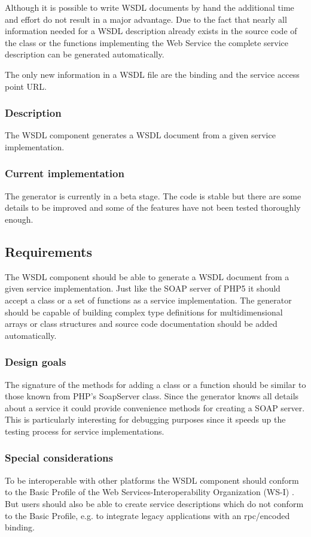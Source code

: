 \documentclass[10pt,final,a4paper,oneside]{article}
\begin{document}
Although it is possible
to write WSDL documents by hand
the additional time and effort
do not result in a major advantage.
Due to the fact that nearly all information
needed for a WSDL description already exists
in the source code of the class or the functions
implementing the Web Service
the complete service description
can be generated automatically.

The only new information in a WSDL file
are the binding and the service access point URL.

\subsubsection{Description}
The WSDL component generates a WSDL document
from a given service implementation.

\subsubsection{Current implementation}
The generator is currently in a beta stage.
The code is stable but there are some details to be improved
and some of the features have not been tested thoroughly enough.

\subsection{Requirements}\label{subsec:WSDLRequirements}
The WSDL component should be able to generate a WSDL document
from a given service implementation.
Just like the SOAP server of PHP5 it should accept
a class or a set of functions as a service implementation.
The generator should be capable of building complex type definitions
for multidimensional arrays or class structures and source code documentation should be added
automatically.

\subsubsection{Design goals}

The signature of the methods for adding a class or a function should
be similar to those known from PHP's SoapServer class.
Since the generator knows all details about a service
it could provide convenience methods for creating a SOAP server.
This is particularly interesting for debugging purposes
since it speeds up the testing process for service implementations.

\subsubsection{Special considerations}
To be interoperable with other platforms
the WSDL component should conform
to the Basic Profile of the
Web Services-Interoperability Organization (WS-I) \cite{BasicProfile}.
But users should also be able to create service descriptions
which do not conform to the Basic Profile,
e.g. to integrate legacy applications
with an rpc/encoded binding.
\end{document}
